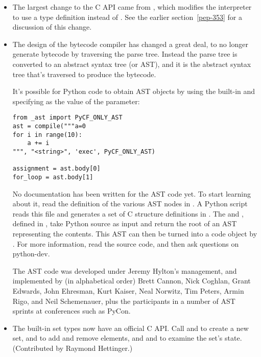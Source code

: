 \documentclass{howto}
\begin{document}
\begin{itemize}

\item The largest change to the C API came from ,
which modifies the interpreter to use a  type
definition instead of .  See the earlier
section~\ref{pep-353} for a discussion of this change.

\item The design of the bytecode compiler has changed a great deal, to
no longer generate bytecode by traversing the parse tree.  Instead
the parse tree is converted to an abstract syntax tree (or AST), and it is 
the abstract syntax tree that's traversed to produce the bytecode.

It's possible for Python code to obtain AST objects by using the 
 built-in and specifying 
as the value of the 
 parameter:

\begin{verbatim}
from _ast import PyCF_ONLY_AST
ast = compile("""a=0
for i in range(10):
    a += i
""", "<string>", 'exec', PyCF_ONLY_AST)

assignment = ast.body[0]
for_loop = ast.body[1]
\end{verbatim}

No documentation has been written for the AST code yet.  To start
learning about it, read the definition of the various AST nodes in
.  A Python script reads this file and
generates a set of C structure definitions in
.  The 
and , defined in
, take Python source as input and return the
root of an AST representing the contents.  This AST can then be turned
into a code object by .  For more
information, read the source code, and then ask questions on
python-dev.

The AST code was developed under Jeremy Hylton's management, and
implemented by (in alphabetical order) Brett Cannon, Nick Coghlan,
Grant Edwards, John Ehresman, Kurt Kaiser, Neal Norwitz, Tim Peters,
Armin Rigo, and Neil Schemenauer, plus the participants in a number of
AST sprints at conferences such as PyCon.
 
\item The built-in set types now have an official C API.  Call
 and  to create a
new set,  and  to
add and remove elements, and  and
 to examine the set's state.
(Contributed by Raymond Hettinger.)


\end{itemize}
\end{document}
